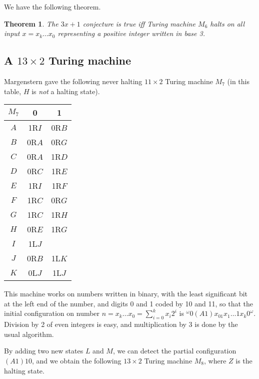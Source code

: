 \documentclass[10pt]{article}
\newtheorem{thm}[prop]{Theorem}
\begin{document}
We have the following theorem.
\begin{thm}
The $3x + 1$ conjecture is true iff Turing machine $M_6$ halts on all
input $x = x_k\ldots x_0$ representing a positive integer written in base 3.
\end{thm}

\subsection{A $13 \times 2$ Turing machine}
Margenstern \cite[Fig.\ 8]{Ma00} gave the following never halting $11 \times 2$
Turing machine $M_7$ (in this table, $H$ is \emph{not} a halting state).

\begin{center}
\begin{tabular}{|c|c|c|}
\hline
$M_7$ &  0  &   1   \\
\hline
$A$ & 1R$I$ & 0R$B$ \\
\hline
$B$ & 0R$A$ & 0R$G$ \\
\hline
$C$ & 0R$A$ & 1R$D$ \\
\hline
$D$ & 0R$C$ & 1R$E$ \\
\hline
$E$ & 1R$I$ & 1R$F$ \\
\hline
$F$ & 1R$C$ & 0R$G$ \\
\hline
$G$ & 1R$C$ & 1R$H$ \\
\hline
$H$ & 0R$E$ & 1R$G$ \\
\hline
$I$ & 1L$J$ &       \\
\hline
$J$ & 0R$B$ & 1L$K$ \\
\hline
$K$ & 0L$J$ & 1L$J$ \\
\hline
\end{tabular}
\end{center}

This machine works on numbers written in binary, with the least significant bit
at the left end of the number, and digits 0 and 1 coded by 10 and 11,
so that the initial configuration on number $n = x_k\ldots x_0 = \sum_{i=0}^k x_i2^i$
is $^\omega 0(A1)x_01x_1\ldots 1x_k0^\omega$. Division by 2 of even integers 
is easy, and multiplication by 3 is done by the usual algorithm.

By adding two new states $L$ and $M$, we can detect the partial configuration
$(A1)10$, and we obtain the following $13 \times 2$ Turing machine $M_8$,
where $Z$ is the halting state.
\end{document}
